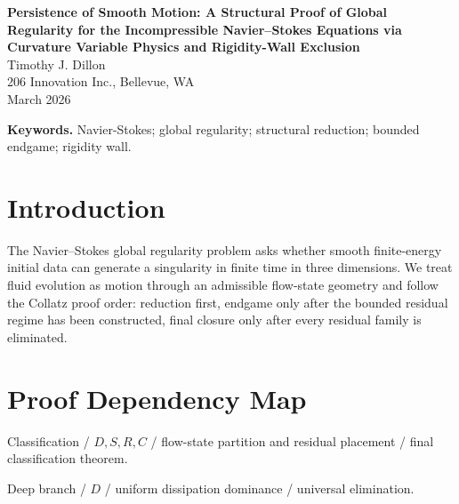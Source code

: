 \documentclass[11pt]{article}
\theoremstyle{definition}
\begin{document}
\begin{center}
{\LARGE \textbf{Persistence of Smooth Motion: A Structural Proof of Global Regularity for the Incompressible Navier--Stokes Equations via Curvature Variable Physics and Rigidity-Wall Exclusion}}\\[0.85em]
{\large Timothy J. Dillon}\\
206 Innovation Inc., Bellevue, WA\\
March 2026
\end{center}

\begin{abstract}
We study the three-dimensional incompressible Navier--Stokes equations through a structural reformulation in which smooth finite-energy flow is governed by admissible motion corridors, vorticity-pressure balance, and rigidity-wall exclusion of singular concentration. We present a reduction-and-closure proof of global regularity based on deep-regime dissipation dominance, segment-model exclusion of blow-up templates, shallow-fragmentation control, bounded near-critical core analysis, and final incompatibility of all residual singular candidates. The full argument reduces hypothetical singular behavior to deep, segment-critical, shallow-return, and near-critical families, then eliminates each family in turn. Consequently every smooth finite-energy solution remains smooth for all time.
\end{abstract}

\noindent\textbf{Keywords.} Navier-Stokes; global regularity; structural reduction; bounded endgame; rigidity wall.

\section{Introduction}
The Navier--Stokes global regularity problem asks whether smooth finite-energy initial data can generate a singularity in finite time in three dimensions. We treat fluid evolution as motion through an admissible flow-state geometry and follow the Collatz proof order: reduction first, endgame only after the bounded residual regime has been constructed, final closure only after every residual family is eliminated.
\section{Proof Dependency Map}
Classification / $D,S,R,C$ / flow-state partition and residual placement / final classification theorem.

Deep branch / $D$ / uniform dissipation dominance / universal elimination.
\end{document}
